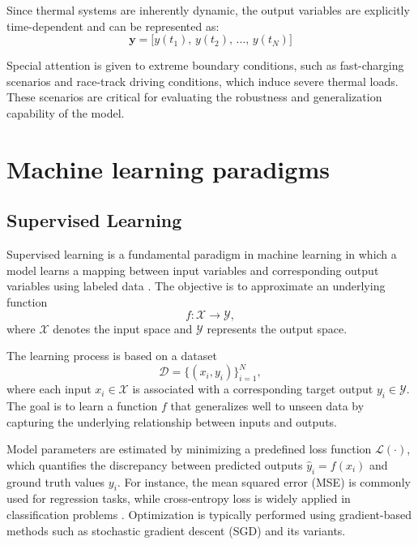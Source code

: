 Since thermal systems are inherently dynamic, the output variables are explicitly time-dependent and can be represented as:
\[
\mathbf{y} = \big[ y(t_1),\, y(t_2),\, \ldots,\, y(t_N) \big]
\]

Special attention is given to extreme boundary conditions, such as fast-charging scenarios and race-track driving conditions, which induce severe thermal loads. These scenarios are critical for evaluating the robustness and generalization capability of the model.

\section{Machine learning paradigms}
\subsection{Supervised Learning}
\label{sec:supervised_learning}

Supervised learning is a fundamental paradigm in machine learning in which a model learns a mapping between input variables and corresponding output variables using labeled data \cite{bishop2006pattern, goodfellow2016deep}. The objective is to approximate an underlying function
\begin{equation}
f: \mathcal{X} \rightarrow \mathcal{Y},
\end{equation}
where $\mathcal{X}$ denotes the input space and $\mathcal{Y}$ represents the output space.

The learning process is based on a dataset
\begin{equation}
\mathcal{D} = \{(x_i, y_i)\}_{i=1}^{N},
\end{equation}
where each input $x_i \in \mathcal{X}$ is associated with a corresponding target output $y_i \in \mathcal{Y}$. The goal is to learn a function $f$ that generalizes well to unseen data by capturing the underlying relationship between inputs and outputs.

Model parameters are estimated by minimizing a predefined loss function $\mathcal{L}(\cdot)$, which quantifies the discrepancy between predicted outputs $\hat{y}_i = f(x_i)$ and ground truth values $y_i$. For instance, the mean squared error (MSE) is commonly used for regression tasks, while cross-entropy loss is widely applied in classification problems \cite{hastie2009elements}. Optimization is typically performed using gradient-based methods such as stochastic gradient descent (SGD) and its variants.

